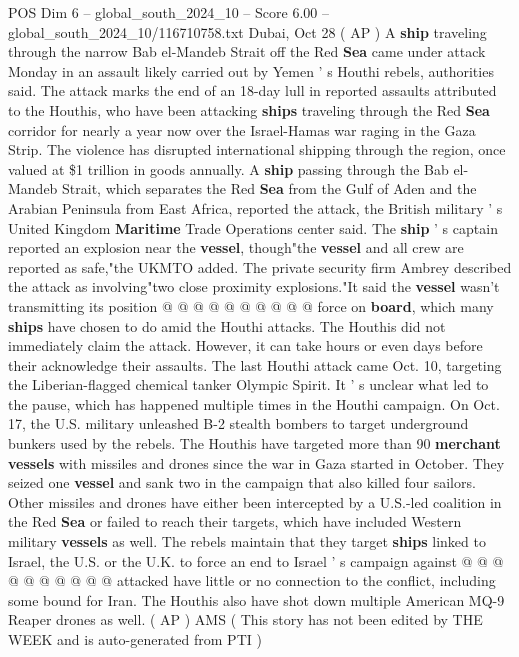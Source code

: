 \begin{textsample}{POS Dim 6 – global\_south\_2024\_10 – Score 6.00 – global\_south\_2024\_10/116710758.txt}  \label{ex:f6_pos_413}
Dubai, Oct 28 ( AP ) A \textbf{ship} traveling through the narrow Bab el-Mandeb Strait off the Red \textbf{Sea} came under attack Monday in an assault likely carried out by Yemen ' s Houthi rebels, authorities said.
The attack marks the end of an 18-day lull in reported assaults attributed to the Houthis, who have been attacking \textbf{ships} traveling through the Red \textbf{Sea} corridor for nearly a year now over the Israel-Hamas war raging in the Gaza Strip.
The violence has disrupted international shipping through the region, once valued at \$1 trillion in goods annually.
A \textbf{ship} passing through the Bab el-Mandeb Strait, which separates the Red \textbf{Sea} from the Gulf of Aden and the Arabian Peninsula from East Africa, reported the attack, the British military ' s United Kingdom \textbf{Maritime} Trade Operations center said.
The \textbf{ship} ' s captain reported an explosion near the \textbf{vessel}, though"the \textbf{vessel} and all crew are reported as safe,"the UKMTO added.
The private security firm Ambrey described the attack as involving"two close proximity explosions."It said the \textbf{vessel} wasn't transmitting its position @ @ @ @ @ @ @ @ @ @ force on \textbf{board}, which many \textbf{ships} have chosen to do amid the Houthi attacks.
The Houthis did not immediately claim the attack.
However, it can take hours or even days before their acknowledge their assaults.
The last Houthi attack came Oct. 10, targeting the Liberian-flagged chemical tanker Olympic Spirit.
It ' s unclear what led to the pause, which has happened multiple times in the Houthi campaign.
On Oct. 17, the U.S. military unleashed B-2 stealth bombers to target underground bunkers used by the rebels.
The Houthis have targeted more than 90 \textbf{merchant} \textbf{vessels} with missiles and drones since the war in Gaza started in October.
They seized one \textbf{vessel} and sank two in the campaign that also killed four sailors.
Other missiles and drones have either been intercepted by a U.S.-led coalition in the Red \textbf{Sea} or failed to reach their targets, which have included Western military \textbf{vessels} as well.
The rebels maintain that they target \textbf{ships} linked to Israel, the U.S. or the U.K. to force an end to Israel ' s campaign against @ @ @ @ @ @ @ @ @ @ attacked have little or no connection to the conflict, including some bound for Iran.
The Houthis also have shot down multiple American MQ-9 Reaper drones as well. ( AP ) AMS ( This story has not been edited by THE WEEK and is auto-generated from PTI )

\end{textsample}
